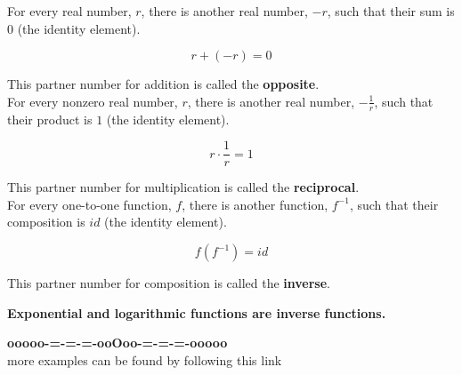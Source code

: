 \documentclass{ximera}
\begin{document}
For every real number, $r$, there is another real number, $-r$, such that their sum is $0$ (the identity element).

\[
r + (-r) = 0
\]

This partner number for addition is called the \textbf{opposite}. \\



For every nonzero real number, $r$, there is another real number, $-\frac{1}{r}$, such that their product is $1$ (the identity element).

\[
r \cdot \frac{1}{r} = 1
\]


This partner number for multiplication is called the \textbf{reciprocal}. \\





For every one-to-one function, $f$, there is another function, $f^{-1}$, such that their composition is $id$ (the identity element).

\[
f \left( f^{-1} \right) = id
\]


This partner number for composition is called the \textbf{inverse}. \\


\begin{idea}

\textbf{\textcolor{blue!55!black}{Exponential and logarithmic functions are inverse functions.}}



\end{idea}













\begin{center}
\textbf{\textcolor{green!50!black}{ooooo-=-=-=-ooOoo-=-=-=-ooooo}} \\

more examples can be found by following this link\\ 

\end{center}
\end{document}
